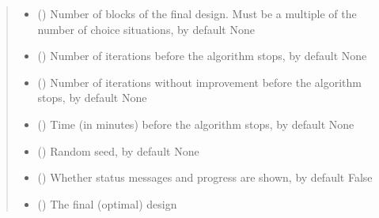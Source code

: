 \documentclass[a4paper,10pt,english]{sphinxhowto}
\begin{document}
\begin{fulllineitems}
\begin{fulllineitems}
\begin{quote}
\begin{description}
\begin{itemize}
\item {} 
\sphinxAtStartPar
{} (\sphinxstyleliteralemphasis{\sphinxupquote{, }}) \textendash{} Number of blocks of the final design. Must be a multiple of the number of
choice situations, by default None

\item {} 
\sphinxAtStartPar
{} (\sphinxstyleliteralemphasis{\sphinxupquote{, }}) \textendash{} Number of iterations before the algorithm stops, by default None

\item {} 
\sphinxAtStartPar
{} (\sphinxstyleliteralemphasis{\sphinxupquote{, }}) \textendash{} Number of iterations without improvement before the algorithm
stops, by default None

\item {} 
\sphinxAtStartPar
{} (\sphinxstyleliteralemphasis{\sphinxupquote{, }}) \textendash{} Time (in minutes) before the algorithm stops, by default None

\item {} 
\sphinxAtStartPar
{} (\sphinxstyleliteralemphasis{\sphinxupquote{, }}) \textendash{} Random seed, by default None

\item {} 
\sphinxAtStartPar
{} (\sphinxstyleliteralemphasis{\sphinxupquote{, }}) \textendash{} Whether status messages and progress are shown, by default False

\end{itemize}

\sphinxAtStartPar
\begin{itemize}
\item {} 
\sphinxAtStartPar
{} () \textendash{} The final (optimal) design


\end{itemize}
\end{description}
\end{quote}
\end{fulllineitems}
\end{fulllineitems}
\end{document}
